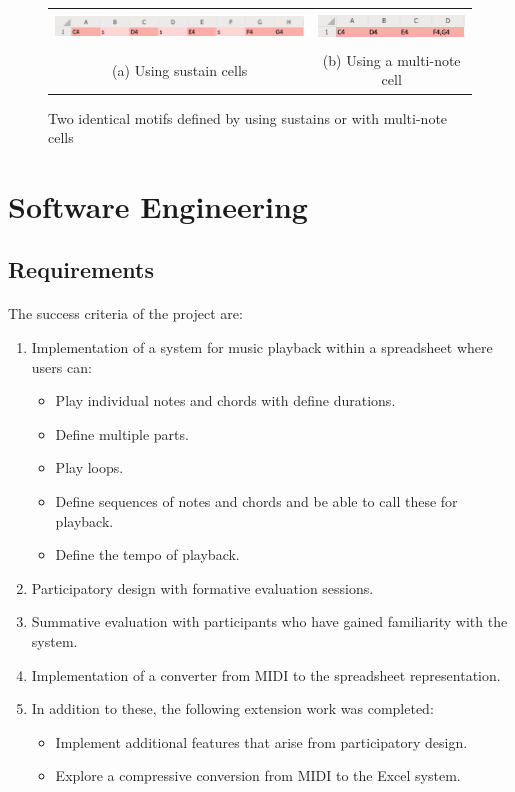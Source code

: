 \begin{figure}[ht]
\begin{tabular}{cc}
  \includegraphics[height=8mm]{figs/withoutMulti.png} &
  \includegraphics[height=8mm]{figs/withMulti.png} \\
  (a) Using sustain cells&(b) Using a multi-note cell\\
\end{tabular}
\caption{Two identical motifs defined by using sustains or with multi-note cells}
\label{prep:sustainMulti}
\end{figure}

\section{Software Engineering}

\subsection{Requirements}

\paragraph{} The success criteria of the project are:

\begin{enumerate}
  \item Implementation of a system for music playback within a spreadsheet where users can:
  \begin{itemize}
     \item Play individual notes and chords with define durations.
     \item Define multiple parts.
     \item Play loops.
     \item Define sequences of notes and chords and be able to call these for playback.
     \item Define the tempo of playback.
   \end{itemize}
  \item Participatory design with formative evaluation sessions.
  \item Summative evaluation with participants who have gained familiarity with the system.
  \item Implementation of a converter from MIDI to the spreadsheet representation.
  \item In addition to these, the following extension work was completed:
  \begin{itemize}
     \item Implement additional features that arise from participatory design.
     \item Explore a compressive conversion from MIDI to the Excel system.
   \end{itemize}
\end{enumerate}


